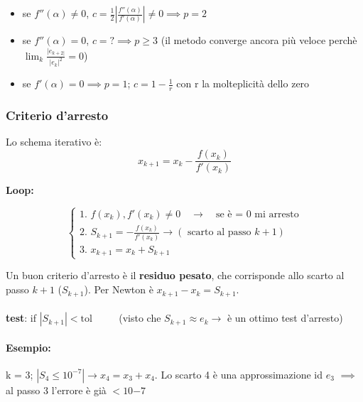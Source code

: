 \documentclass[a4paper, 11pt]{article}
\begin{document}
        \begin{itemize}
            \item se $f''(\alpha) \neq 0$, $c =\frac{1}{2} \left | \frac{f''(\alpha)}{f'(\alpha)} \right | \neq 0 \implies p = 2$
            \item se $f''(\alpha) =  0$, $c = ? \implies p \ge 3$ (il metodo converge ancora più veloce perchè $\lim_k \frac{|e_{k+2|}}{|e_k|^2} = 0$)
            \item se $f'(\alpha) = 0 \implies p = 1$; $c = 1 - \frac{1}{r}$ con r la molteplicità dello zero  
        \end{itemize}


                
        \subsubsection{Criterio d'arresto}

        Lo schema iterativo è:
        \[
            x_{k+1} = x_k - \frac{f(x_k)}{f'(x_k)}
        \]

        \textbf{Loop:}

        \[
        \begin{cases}
            \text{1. } f(x_k), f'(x_k) \neq 0 \quad \rightarrow \quad \text{se è = 0 mi arresto}\\
            \text{2. } S_{k+1} = - \frac{f(x_k)}{f'(x_k)} \rightarrow (\text{ scarto al passo } k+1) \\
            \text{3. } x_{k+1} = x_k + S_{k+1}
        \end{cases}
        \]

        Un buon criterio d'arresto è il \textbf{residuo pesato}, che corrisponde allo scarto al passo $k+1$ ($S_{k+1}$). Per Newton è $x_{k+1} - x_k = S_{k+1}$.
        \paragraph{}

        \textbf{test}: if $|S_{k+1}| < \text{tol}$ $\quad \quad$ (visto che $S_{k+1} \approx e_k \rightarrow$ è un ottimo test d'arresto)

        \paragraph{Esempio: } k = 3; $|S_4  \le 10^{-7}| \rightarrow x_4 = x_3+x_4$. Lo scarto 4 è una approssimazione id $e_3$ $\implies$ al passo 3 l'errore è già $< 10{-7}$
\end{document}
